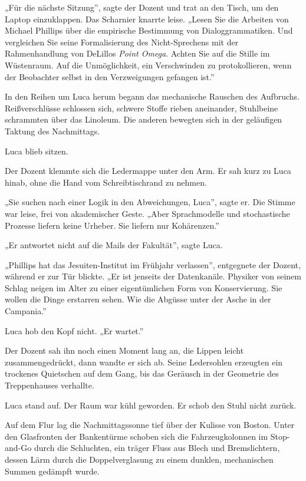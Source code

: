 \documentclass[
  ngerman,
]{article}
\begin{document}
„Für die nächste Sitzung'', sagte der Dozent und trat an den Tisch, um
den Laptop einzuklappen. Das Scharnier knarrte leise. „Lesen Sie die
Arbeiten von Michael Phillips über die empirische Bestimmung von
Dialoggrammatiken. Und vergleichen Sie seine Formalisierung des
Nicht-Sprechens mit der Rahmenhandlung von DeLillos \emph{Point Omega}.
Achten Sie auf die Stille im Wüstenraum. Auf die Unmöglichkeit, ein
Verschwinden zu protokollieren, wenn der Beobachter selbst in den
Verzweigungen gefangen ist.''

In den Reihen um Luca herum begann das mechanische Rauschen des
Aufbruchs. Reißverschlüsse schlossen sich, schwere Stoffe rieben
aneinander, Stuhlbeine schrammten über das Linoleum. Die anderen
bewegten sich in der geläufigen Taktung des Nachmittags.

Luca blieb sitzen.

Der Dozent klemmte sich die Ledermappe unter den Arm. Er sah kurz zu
Luca hinab, ohne die Hand vom Schreibtischrand zu nehmen.

„Sie suchen nach einer Logik in den Abweichungen, Luca'', sagte er. Die
Stimme war leise, frei von akademischer Geste. „Aber Sprachmodelle und
stochastische Prozesse liefern keine Urheber. Sie liefern nur
Kohärenzen.''

„Er antwortet nicht auf die Mails der Fakultät'', sagte Luca.

„Phillips hat das Jesuiten-Institut im Frühjahr verlassen'', entgegnete
der Dozent, während er zur Tür blickte. „Er ist jenseits der
Datenkanäle. Physiker von seinem Schlag neigen im Alter zu einer
eigentümlichen Form von Konservierung. Sie wollen die Dinge erstarren
sehen. Wie die Abgüsse unter der Asche in der Campania.''

Luca hob den Kopf nicht. „Er wartet.''

Der Dozent sah ihn noch einen Moment lang an, die Lippen leicht
zusammengedrückt, dann wandte er sich ab. Seine Ledersohlen erzeugten
ein trockenes Quietschen auf dem Gang, bis das Geräusch in der Geometrie
des Treppenhauses verhallte.

Luca stand auf. Der Raum war kühl geworden. Er schob den Stuhl nicht
zurück.

Auf dem Flur lag die Nachmittagssonne tief über der Kulisse von Boston.
Unter den Glasfronten der Bankentürme schoben sich die Fahrzeugkolonnen
im Stop-and-Go durch die Schluchten, ein träger Fluss aus Blech und
Bremslichtern, dessen Lärm durch die Doppelverglasung zu einem dunklen,
mechanischen Summen gedämpft wurde.
\end{document}
